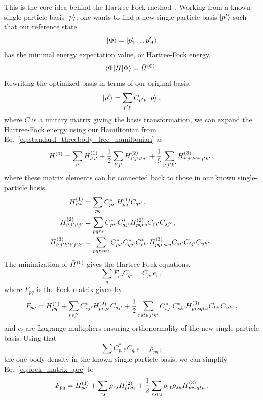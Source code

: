 This is the core idea behind the Hartree-Fock method~\cite{Slat28hf,Fock30hf,Hart28hf}.
Working from a known single-particle basis $\ket{p}$,
one wants to find a new single-particle basis $\ket{p'}$
such that our reference state
\begin{equation}
  \ket{\Phi} = \ket{p_{1}^{\prime} \ldots p_{A}^{\prime}}
\end{equation}
has the minimal energy expectation value, or Hartree-Fock energy,
\begin{equation}
  \braket{\Phi | H | \Phi} = {\bar{H}}^{(0)}\,.
\end{equation}
Rewriting the optimized basis in terms of our original basis,
\begin{equation}
  \ket{p'} = \sum_{p'p}C_{p'p} \ket{p}\,,
\end{equation}
where $C$ is a unitary matrix giving the basis transformation,
we can expand the Hartree-Fock energy
using our Hamiltonian from Eq.~\eqref{eq:standard_threebody_free_hamiltonian} as
\begin{equation}
  {\bar{H}}^{(0)} = \sum_{i'} {H}^{(1)}_{i'i'} + \frac{1}{2}\sum_{i'j'} {H}^{(2)}_{i'j'i'j'}
  + \frac{1}{6}\sum_{i'j'k'} {H}^{(3)}_{i'j'k'i'j'k'}\,,
\end{equation}
where these matrix elements can be connected back to those in our known single-particle basis,
\begin{align}
  {H}^{(1)}_{i'i'}           & = \sum_{pq} C_{pi'}^{*} {H}^{(1)}_{pq} C_{q i'}\,,                                                 \\
  {H}^{(2)}_{i'j'i'j'}       & = \sum_{pqrs} C_{pi'}^{*}C_{qj'}^{*} {H}^{(2)}_{pqrs} C_{r i'}C_{s j'}\,,                          \\
  {H}^{(3)}_{i'j'k'i'j'k'} & = \sum_{pqrstu} C_{pi'}^{*}C_{qj'}^{*}C_{rk'}^{*} {H}^{(3)}_{pqrstu} C_{s i'}C_{t j'}C_{u k'}\,.
\end{align}
The minimization of ${\bar{H}}^{(0)}$ gives the Hartree-Fock equations,
\begin{equation}\label{eq:hf_eq}
  \sum_{q} F_{pq} C_{qr} = C_{pr} e_{r}\,,
\end{equation}
where $F_{pq}$ is the Fock matrix given by
\begin{equation}\label{eq:fock_matrix_pre}
  F_{pq} = {H}^{(1)}_{pq} + \sum_{rsj'} C_{rj'}^{*} {H}^{(2)}_{prqs} C_{s j'} + \frac{1}{2}\sum_{rstu j'k'} C_{rj'}^{*}C_{sk'}^{*} {H}^{(3)}_{prsqtu} C_{t j'}C_{u k'}\,,
\end{equation}
and $e_i$ are Lagrange multipliers
ensuring orthonormality of the new single-particle basis.
Using that
\begin{equation}\label{eq:hf_density_update}
  \sum C_{p, i'}^{*} C_{q, i'} = \rho_{pq}\,,
\end{equation}
the one-body density in the known single-particle basis,
we can simplify Eq.~\eqref{eq:fock_matrix_pre} to
\begin{equation}\label{eq:fock_matrix}
  F_{pq} = {H}^{(1)}_{pq} + \sum_{rs} \rho_{rs} {H}^{(2)}_{prqs} + \frac{1}{2}\sum_{rstu}\rho_{rt} \rho_{su} {H}^{(3)}_{prsqtu}\,.
\end{equation}

